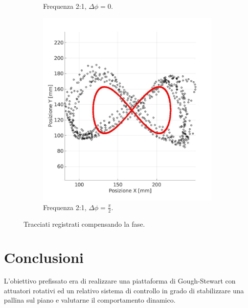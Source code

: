 \documentclass[12pt,twoside,openright]{report}
\begin{document}
\begin{figure}[h!]
\begin{subfigure}{0.49\textwidth}
    \caption{Frequenza 2:1, $\Delta \phi= 0$.}
    \label{fig:uc1}
\end{subfigure}
\hfill
\begin{subfigure}{0.49\textwidth}
    \includegraphics[width=\textwidth]{ic.jpg}
    \caption{Frequenza 2:1, $\Delta \phi= \frac{\pi}{2}$.}
    \label{fig:ic1}
\end{subfigure}     
\vspace*{10mm}
\caption{Tracciati registrati compensando la fase.}
\end{figure}
\label{fig:phasecorr}


\chapter{Conclusioni}
L'obiettivo prefissato era di realizzare una piattaforma di Gough-Stewart con attuatori rotativi ed un relativo sistema di controllo in grado di stabilizzare una pallina sul piano e valutarne il comportamento dinamico. %
\end{document}
